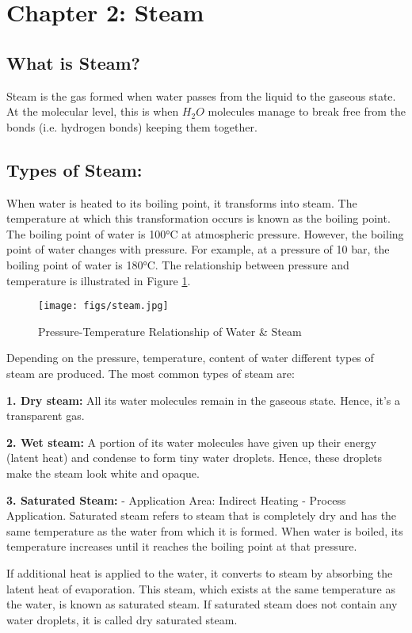 
\section{Chapter 2: Steam}
\subsection{What is Steam?}
Steam is the gas formed when water passes from the liquid to the gaseous state.
At the molecular level, this is when $H_2O$ molecules manage to break free from the bonds 
(i.e. hydrogen bonds) keeping them together\cite{what_is_steam}\relax.


\subsection{Types of Steam:}
When water is heated to its boiling point, it transforms into steam. The temperature at which this transformation occurs is known as the boiling point. The boiling point of water is 100°C at atmospheric pressure. However, the boiling point of water changes with pressure. For example, at a pressure of 10 bar, the boiling point of water is 180°C. The relationship between pressure and temperature is illustrated in Figure \ref{fig:ptrws}.

\begin{figure}[h!]
    \centering
    \texttt{[image: figs/steam.jpg]}
    \caption{Pressure-Temperature Relationship of Water \& Steam}
    \label{fig:ptrws}
\end{figure}
Depending on the pressure, temperature, content of water different types of steam are produced. The most common types of steam are:

\textbf{1. Dry steam:} All its water molecules remain in the gaseous state. Hence, it's a transparent gas\cite{steam_types_tlv}.

\textbf{2. Wet steam:} A portion of its water molecules have given up their energy (latent heat) and condense to form tiny water droplets. Hence, these droplets make the steam look white and opaque\cite{steam_types_tlv}.

\textbf{3. Saturated Steam:} - Application Area: Indirect Heating - Process Application.
Saturated steam refers to steam that is completely dry and has the same temperature as the water from which it is formed. When water is boiled, its temperature increases until it reaches the boiling point at that pressure.

If additional heat is applied to the water, it converts to steam by absorbing the latent heat of evaporation. This steam, which exists at the same temperature as the water, is known as saturated steam. If saturated steam does not contain any water droplets, it is called dry saturated steam\cite{steam_types_fm}.

